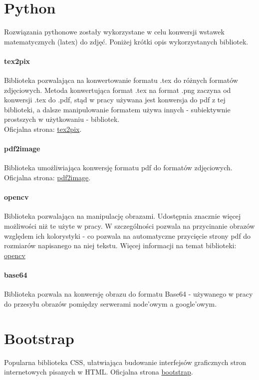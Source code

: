 \section{Python}
Rozwiązania pythonowe zostały wykorzystane w celu konwersji wstawek matematycznych (latex) do zdjęć. Poniżej krótki opis wykorzystanych bibliotek.
\paragraph{tex2pix} Biblioteka pozwalająca na konwertowanie formatu .tex do różnych formatów zdjęciowych. Metoda konwertująca format .tex na format .png zaczyna od konwersji .tex do .pdf, stąd w pracy używana jest konwersja do pdf z tej biblioteki, a dalsze manipulowanie formatem używa innych - subiektywnie prostszych w użytkowaniu - bibliotek. 
\\Oficjalna strona: \href{https://pypi.org/project/tex2pix/}{tex2pix}.

\paragraph{pdf2image} Biblioteka  umożliwiająca konwersję formatu pdf do formatów zdjęciowych.
\\Oficjalna strona: \href{https://pypi.org/project/pdf2image/}{pdf2image}.
\paragraph{opencv} Biblioteka pozwalająca na manipulację obrazami. Udostępnia znacznie więcej możliwości niż te użyte w pracy. W szczególności pozwala na przycinanie obrazów względem ich kolorystyki - co pozwala na automatyczne przycięcie strony pdf do rozmiarów napisanego na niej tekstu. Więcej informacji na temat biblioteki: \href{https://pypi.org/project/opencv-python/}{opencv}
\paragraph{base64} Biblioteka pozwala na konwersję obrazu do formatu Base64 - używanego w pracy do przesyłu obrazów pomiędzy serwerami node'owym a google'owym. 

\section{Bootstrap}  
Popularna biblioteka CSS, ułatwiająca budowanie interfejsów graficznych stron internetowych pisanych w HTML. Oficjalna strona \href{https://getbootstrap.com/}{bootstrap}.




